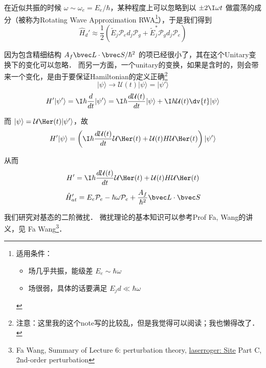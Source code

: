 在近似共振的时候 $\omega\sim\omega_e = E_e/\hbar$，某种程度上可以忽略到以 $\pm 2\I\omega t$ 做震荡的成分（被称为Rotating Wave Approximation RWA\footnote{适用条件：
\begin{itemize}
\item 场几乎共振，能级差 $E_e \sim \hbar \omega$
\item 场很弱，具体的话要满足 $E_j d \ll \hbar\omega$ \end{itemize}}），于是我们得到
\begin{equation}
\hat{H}_d' \approx \frac{1}{2}\left(\tilde{E}_j\mathcal{P}_e d_j \mathcal{P}_g + \tilde{E}_j^*\mathcal{P}_g d_j \mathcal{P}_e\right)
\end{equation}

因为包含精细结构 $A_f\bvec L\cdot \bvec S/\hbar^2$ 的项已经很小了，其在这个Unitary变换下的变化可以忽略． 而另一方面，一个unitary的变换，如果是含时的，则会带来一个变化，是由于要保证Hamiltonian的定义正确\footnote{注意：这里我的这个note写的比较乱，但是我觉得可以阅读；我也懒得改了．}
\begin{equation}
|\psi\rangle \to \mathcal{U}(t)|\psi\rangle = |\psi'\rangle
\end{equation}
\begin{equation}
H'|\psi'\rangle = \I\hbar\frac{d}{dt}|\psi'\rangle = \I\hbar\frac{d \mathcal{U}(t)}{dt}|\psi\rangle + \I\hbar\mathcal{U}(t) \dv{t} |\psi\rangle
\end{equation}

而 $|\psi\rangle = \mathcal{U}\Her(t)|\psi'\rangle$，故
\begin{equation}
H'|\psi\rangle = \left(\I\hbar\frac{d\mathcal{U}(t)}{dt}\mathcal{U}\Her(t) + \mathcal{U}(t)H\mathcal{U}\Her(t)\right)|\psi'\rangle 
\end{equation}

从而
\begin{equation}
H'= \I\hbar\frac{d\mathcal{U}(t)}{dt}\mathcal{U}\Her(t) + \mathcal{U}(t)H\mathcal{U}\Her(t)
\end{equation}
\begin{equation}
\hat{H}'_{at} = E_e \mathcal{P}_e - \hbar\omega\mathcal{P}_e + \frac{A_{f}}{\hbar^2}\bvec L\cdot \bvec S 
\end{equation}

我们研究对基态的二阶微扰． 微扰理论的基本知识可以参考Prof Fa, Wang的讲义，见 Fa Wang\footnote{Fa Wang, Summary of Lecture 6: perturbation theory, \href{http://laserroger.github.io/PekingPhysics/ADVQM2014/Lectures/Lecture06.pdf}{laserroger: Site} Part C, 2nd-order perturbation}．

